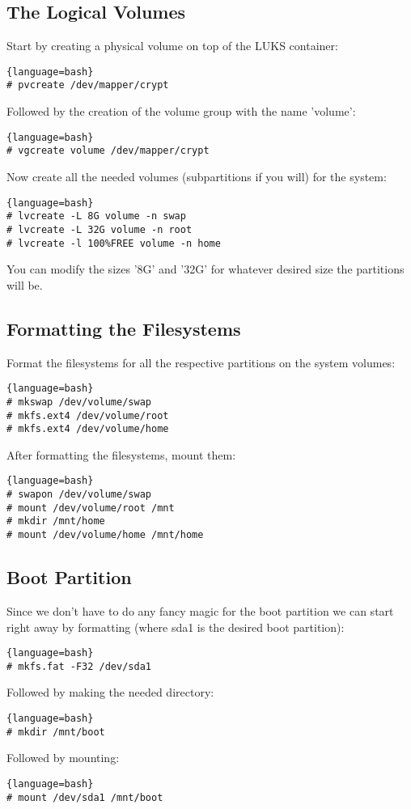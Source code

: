 \subsection{The Logical Volumes}
Start by creating a physical volume on top of the LUKS container:
\begin{lstlisting}{language=bash}
# pvcreate /dev/mapper/crypt
\end{lstlisting}
Followed by the creation of the volume group with the name 'volume':
\begin{lstlisting}{language=bash}
# vgcreate volume /dev/mapper/crypt
\end{lstlisting}
Now create all the needed volumes (subpartitions if you will) for the system:
\begin{lstlisting}{language=bash}
# lvcreate -L 8G volume -n swap
# lvcreate -L 32G volume -n root
# lvcreate -l 100%FREE volume -n home
\end{lstlisting}
You can modify the sizes '8G' and '32G' for whatever desired size the partitions will be.

\subsection{Formatting the Filesystems}
Format the filesystems for all the respective partitions on the system volumes:
\begin{lstlisting}{language=bash}
# mkswap /dev/volume/swap
# mkfs.ext4 /dev/volume/root
# mkfs.ext4 /dev/volume/home
\end{lstlisting}
After formatting the filesystems, mount them:
\begin{lstlisting}{language=bash}
# swapon /dev/volume/swap
# mount /dev/volume/root /mnt
# mkdir /mnt/home
# mount /dev/volume/home /mnt/home
\end{lstlisting}

\subsection{Boot Partition}
Since we don't have to do any fancy magic for the boot partition we can start right away by formatting (where sda1 is the desired boot partition):
\begin{lstlisting}{language=bash}
# mkfs.fat -F32 /dev/sda1
\end{lstlisting}
Followed by making the needed directory:
\begin{lstlisting}{language=bash}
# mkdir /mnt/boot
\end{lstlisting}
Followed by mounting:
\begin{lstlisting}{language=bash}
# mount /dev/sda1 /mnt/boot
\end{lstlisting}
